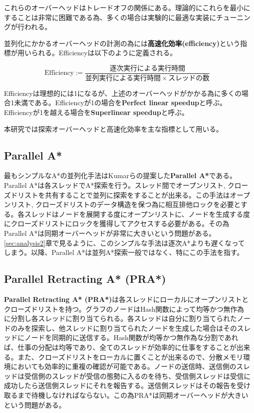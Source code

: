 \documentclass[uplatex]{jsarticle}
\begin{document}
これらのオーバーヘッドはトレードオフの関係にある。理論的にこれらを最小にすることは非常に困難である為、多くの場合は実験的に最適な実装にチューニングが行われる。

並列化にかかるオーバーヘッドの計測の為には\textbf{高速化効率(efficiency)}という指標が用いられる。Efficiencyは以下のように定義される。

\begin{equation}
	\mbox{Efficiency} := \frac{逐次実行による実行時間}{並列実行による実行時間 \times スレッドの数} 
\end{equation}

Efficiencyは理想的には1になるが、上述のオーバーヘッドがかかる為に多くの場合1未満である。Efficiencyが1の場合を\textbf{Perfect linear speedup}と呼ぶ。Efficiencyが1を越える場合を\textbf{Superlinear speedup}と呼ぶ。

本研究では探索オーバーヘッドと高速化効率を主な指標として用いる。

\subsection{Parallel A*}
最もシンプルなA*の並列化手法はKumarらの提案した\textbf{Parallel A*}である\cite{Kumar1988parallel}。Parallel A*は各スレッドでA*探索を行う。スレッド間でオープンリスト, クローズドリストを共有することで並列に探索をすることが出来る。この手法はオープンリスト, クローズドリストのデータ構造を保つ為に相互排他ロックを必要とする。各スレッドはノードを展開する度にオープンリストに、ノードを生成する度にクローズドリストにロックを獲得してアクセスする必要がある。その為Parallel A*は同期オーバーヘッドが非常に大きいという問題がある。\ref{sec:analysis2}章で見るように、このシンプルな手法は逐次A*よりも遅くなってしまう。以降、Parallel A*は並列A*探索一般ではなく、特にこの手法を指す。


\subsection{Parallel Retracting A* (PRA*)}
\textbf{Parallel Retracting A* (PRA*)}は各スレッドにローカルにオープンリストとクローズドリストを持つ\cite{evett1995massively}。グラフのノードはHash関数によって均等かつ無作為に分割し各スレッドに割り当てられる。各スレッドは自分に割り当てられたノードのみを探索し、他スレッドに割り当てられたノードを生成した場合はそのスレッドにノードを同期的に送信する。Hash関数が均等かつ無作為な分割であれば、仕事の分配は均等であり、全てのスレッドが効率的に仕事をすることが出来る。また、クローズドリストをローカルに置くことが出来るので、分散メモリ環境においても効率的に重複の確認が可能である。ノードの送信時、送信側のスレッドは受信側のスレッドが受信の態勢に入るのを待ち、受信側スレッドは受信に成功したら送信側スレッドにそれを報告する。送信側スレッドはその報告を受け取るまで待機しなければならない。この為PRA*は同期オーバーヘッドが大きいという問題がある。
\newline
\end{document}
